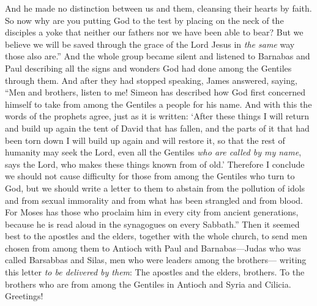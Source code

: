 \begin{biblechapter}
\verse And he made no distinction between us and them, cleansing their hearts by faith.
\verse So now why are you putting God to the test by placing on the neck of the disciples a yoke that neither our fathers nor we have been able to bear?
\verse But we believe we will be saved through the grace of the Lord Jesus in \textit{the same} way those also are.”
\verse And the whole group became silent and listened to Barnabas and Paul describing all the signs and wonders God had done among the Gentiles through them.
\verse And after they had stopped speaking, James answered, saying, “Men and brothers, listen to me!
\verse Simeon has described how God first concerned himself to take from among the Gentiles a people for his name.
\verse And with this the words of the prophets agree, just as it is written:
\verse ‘After these things I will return 
and build up again the tent of David that has fallen, 
and the parts of it that had been torn down I will build up again 
and will restore it,
\verse so that the rest of humanity may seek the Lord, 
even all the Gentiles \textit{who are called by my name}, 
says the Lord, who makes these things
\verse known from of old.’
\verse Therefore I conclude we should not cause difficulty for those from among the Gentiles who turn to God,
\verse but we should write a letter to them to abstain from the pollution of idols and from sexual immorality and from what has been strangled and from blood.
\verse For Moses has those who proclaim him in every city from ancient generations, because he is read aloud in the synagogues on every Sabbath.”
 Then it seemed best to the apostles and the elders, together with the whole church, to send men chosen from among them to Antioch with Paul and Barnabas—Judas who was called Barsabbas and Silas, men who were leaders among the brothers—
\verse writing this letter \textit{to be delivered by them}: The apostles and the elders, brothers. To the brothers who are from among the Gentiles in Antioch and Syria and Cilicia. Greetings!

\end{biblechapter}
